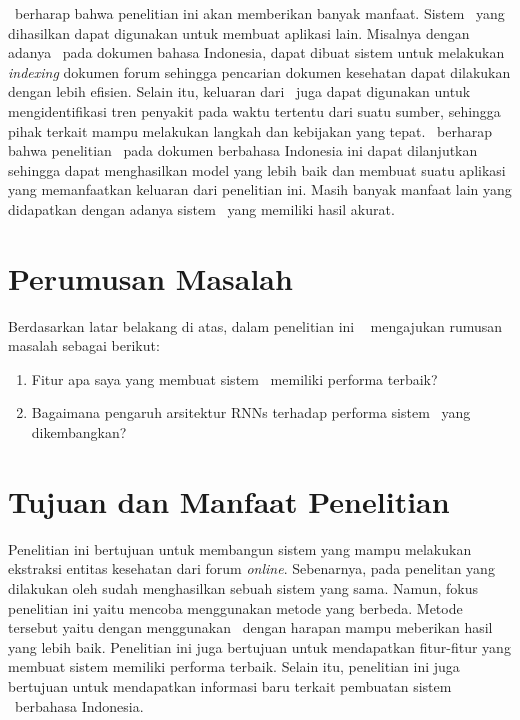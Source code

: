 	\Saya~berharap bahwa penelitian ini akan memberikan banyak manfaat. Sistem \mer~yang dihasilkan dapat digunakan untuk membuat aplikasi lain. Misalnya dengan adanya \mer~pada dokumen bahasa Indonesia, dapat dibuat sistem untuk melakukan \textit{indexing} dokumen forum sehingga pencarian dokumen kesehatan dapat dilakukan dengan lebih efisien. Selain itu, keluaran dari \mer~juga dapat digunakan untuk mengidentifikasi tren penyakit pada waktu tertentu dari suatu sumber, sehingga pihak terkait mampu melakukan langkah dan kebijakan yang tepat. \Saya~berharap bahwa penelitian \mer~pada dokumen berbahasa Indonesia ini dapat dilanjutkan sehingga dapat menghasilkan model yang lebih baik dan membuat suatu aplikasi yang memanfaatkan keluaran dari penelitian ini. Masih banyak manfaat lain yang didapatkan dengan adanya sistem \mer~yang memiliki hasil akurat. 

\section{Perumusan Masalah}
Berdasarkan latar belakang di atas, dalam penelitian ini \saya~ mengajukan rumusan masalah sebagai berikut:
\begin{enumerate}
	\item Fitur apa saya yang membuat sistem \mer~memiliki performa terbaik?
	\item Bagaimana pengaruh arsitektur RNNs terhadap performa sistem \mer~yang dikembangkan?
\end{enumerate}

\section{Tujuan dan Manfaat Penelitian}
Penelitian ini bertujuan untuk membangun sistem yang mampu melakukan ekstraksi entitas kesehatan dari forum \textit{online}. Sebenarnya, pada penelitan yang dilakukan oleh \cite{skripsiKakRadit} sudah menghasilkan sebuah sistem yang sama. Namun, fokus penelitian ini yaitu mencoba menggunakan metode yang berbeda. Metode tersebut yaitu dengan menggunakan \rnn~dengan harapan mampu meberikan hasil yang lebih baik. Penelitian ini juga bertujuan untuk mendapatkan fitur-fitur yang membuat sistem memiliki performa terbaik. Selain itu, penelitian ini juga bertujuan untuk mendapatkan informasi baru terkait pembuatan sistem \mer~berbahasa Indonesia.

